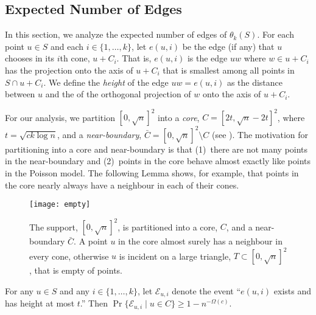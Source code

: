 \documentclass{patmorin}
\begin{document}
\subsection{Expected Number of Edges}

In this section, we analyze the expected number of edges of $\theta_k(S)$.
For each point $u\in S$ and each $i\in\{1,\ldots,k\}$, let $e(u,i)$ be
the edge (if any) that $u$ chooses in its $i$th cone, $u+C_i$.  That is,
$e(u,i)$ is the edge $uw$ where $w\in u+C_i$ has the projection onto
the axis of $u+C_i$ that is smallest among all points in $S\cap u+C_i$.
We define the \emph{height} of the edge $uw=e(u,i)$ as the distance
between $u$ and the of the orthogonal projection of $w$ onto the axis
of $u+C_i$.

For our analysis, we partition $[0,\sqrt{n}]^2$ into a
\emph{core}, $C=[2t,\sqrt{n}-2t]^2$, where $t=\sqrt{ck\log n}$,
and a \emph{near-boundary}, $\bar{C}=[0,\sqrt{n}]^2\setminus C$
(see ).  The motivation for partitioning into a core and
near-boundary is that (1)~there are not many points in the near-boundary
and (2)~points in the core behave almost exactly like points in the
Poisson model.  The following Lemma shows, for example, that points in
the core nearly always have a neighbour in each of their cones.

\begin{figure}
  \begin{center}
    \texttt{[image: empty]}
  \end{center}
  \caption{The support, $[0,\sqrt{n}]^2$, is partitioned into a core, $C$,
    and a near-boundary $\bar{C}$.  A point $u$ in the core almost surely
    has a neighbour in every cone, otherwise $u$ is incident on a large
    triangle, $T\subset [0,\sqrt{n}]^2$, that is empty of points.}
\end{figure}

\newcommand{\eui}{\mathcal{E}_{u,i}}
\newcommand{\neui}{\bar{\mathcal{E}}_{u,i}}

\begin{lem}
  For any $u\in S$ and any $i\in\{1,\ldots,k\}$, let $\eui$ denote
  the event ``$e(u,i)$ exists and has height at most $t$.''  Then
  $\Pr\{\eui\mid u\in C\} \ge 1-n^{-\Omega(c)}$.
\end{lem}
\end{document}
